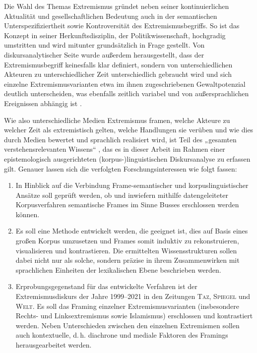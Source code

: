 Die Wahl des Themas Extremismus gründet neben seiner kontinuierlichen Aktualität und gesellschaftlichen Bedeutung auch in der semantischen Unterspezifiziertheit sowie Kontroversität des Extremismusbegriffs. So ist das Konzept in seiner Herkunftsdisziplin, der Politikwissenschaft, hochgradig umstritten und wird mitunter grundsätzlich in Frage gestellt. Von diskursanalytischer Seite wurde außerdem herausgestellt, dass der Extremismusbegriff keinesfalls klar definiert, sondern von unterschiedlichen Akteuren zu unterschiedlicher Zeit unterschiedlich gebraucht wird \autocite{ackermannMetamorphosenExtremismusbegriffesDiskursanalytische2015} und sich einzelne Extremismusvarianten etwa im ihnen zugeschriebenen Gewaltpotenzial deutlich unterscheiden, was ebenfalls zeitlich variabel und von außersprachlichen Ereignissen abhängig ist \autocite{czuloEinflussExtremistischerGewaltereignisse2020}.

Wie also unterschiedliche Medien Extremismus framen, welche Akteure zu welcher Zeit als extremistisch gelten, welche Handlungen sie verüben und wie dies durch Medien bewertet und sprachlich realisiert wird, ist Teil des „gesamten verstehensrelevanten Wissens`` \autocite[805]{busseFrameSemantikKompendium2012}, das es in dieser Arbeit im Rahmen einer epistemologisch ausgerichteten (korpus\mbox{-})linguistischen Diskursanalyse zu erfassen gilt. Genauer lassen sich die verfolgten Forschungsinteressen wie folgt fassen:

\begin{enumerate}
\def\labelenumi{\arabic{enumi}.}
\item
  In Hinblick auf die Verbindung Frame-semantischer und korpuslinguistischer Ansätze soll geprüft werden, ob und inwiefern mithilfe datengeleiteter Korpusverfahren semantische Frames im Sinne Busses \autocite*{busseFrameSemantikKompendium2012} erschlossen werden können.
\item
  Es soll eine Methode entwickelt werden, die geeignet ist, dies auf Basis eines großen Korpus umzusetzen und Frames somit induktiv zu rekonstruieren, visualisieren und kontrastieren. Die ermittelten Wissensstrukturen sollen dabei nicht nur als solche, sondern präzise in ihrem Zusammenwirken mit sprachlichen Einheiten der lexikalischen Ebene beschrieben werden.
\item
  Erprobungsgegenstand für das entwickelte Verfahren ist der Extremismusdiskurs der Jahre 1999--2021 in den Zeitungen \textsc{Taz}, \textsc{Spiegel} und \textsc{Welt}. Es soll das Framing einzelner Extremismusvarianten (insbesondere Rechts- und Linksextremismus sowie Islamismus) erschlossen und kontrastiert werden. Neben Unterschieden zwischen den einzelnen Extremismen sollen auch kontextuelle, d.\,h. diachrone und mediale Faktoren des Framings herausgearbeitet werden.
\end{enumerate}

